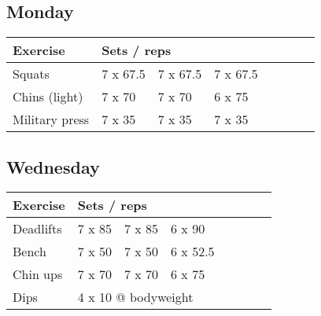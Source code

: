 \documentclass[12pt, a4paper]{article}%
\begin{document}
  \subsection*{\hspace{0.5em} Monday }


  \begin{tabular}{l|lllllll}
  \hspace{0.75em} \textbf{Exercise} & \multicolumn{ 7 }{l}{ \textbf{Sets / reps} } \\ \hline

            \hspace{0.75em} Squats
            & 7 x 67.5
            & 7 x 67.5
            & 7 x 67.5
            & 
            & 
            & 
            & 
            \\


            \hspace{0.75em} Chins (light)
            & 7 x 70
            & 7 x 70
            & 6 x 75
            & 
            & 
            & 
            & 
            \\


            \hspace{0.75em} Military press
            & 7 x 35
            & 7 x 35
            & 7 x 35
            & 
            & 
            & 
            & 
            \\


  \end{tabular}

  \subsection*{\hspace{0.5em} Wednesday }


  \begin{tabular}{l|lllllll}
  \hspace{0.75em} \textbf{Exercise} & \multicolumn{ 7 }{l}{ \textbf{Sets / reps} } \\ \hline

            \hspace{0.75em} Deadlifts
            & 7 x 85
            & 7 x 85
            & 6 x 90
            & 
            & 
            & 
            & 
            \\


            \hspace{0.75em} Bench
            & 7 x 50
            & 7 x 50
            & 6 x 52.5
            & 
            & 
            & 
            & 
            \\


            \hspace{0.75em} Chin ups
            & 7 x 70
            & 7 x 70
            & 6 x 75
            & 
            & 
            & 
            & 
            \\


   \hspace{0.75em} Dips &  \multicolumn{ 7 }{l}{ 4 x 10 @ bodyweight } \\
  \end{tabular}
\end{document}
